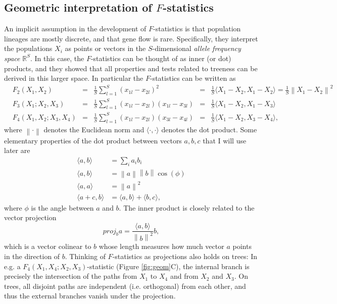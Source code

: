 \documentclass[12pt,fullpage, a4paper]{article}
\newcommand{\norm}[1]{\left\lVert#1\right\rVert}
\newcommand{\normsq}[1]{\left\lVert#1\right\rVert^2}
\newcommand{\vectorproj}[2][]{\textit{proj}_{#1}#2}
\begin{document}
\subsection{Geometric interpretation of $F$-statistics}
An implicit assumption in the development of $F$-statistics is that population lineages are mostly discrete, and that gene flow is rare. Specifically, they interpret the populations $X_i$ as points or vectors in the $S$-dimensional \emph{allele frequency space} $\mathbb{R}^S$. In this case, the $F$-statistics can be thought of as inner (or dot) products, and they showed that all properties and tests related to treeness can be derived in this larger space. In particular the $F$-statistics can be written as
\begin{subequations}
	\begin{align}
	&F_2(X_1, X_2) &=& \frac{1}{S}\sum_{l=1}^S(x_{1l} - x_{2l})^2
	&=& \frac{1}{S}\langle X_1 - X_2, X_1 - X_2 \rangle = \frac{1}{S}\normsq{X_1-  X_2}\\
	&F_3(X_1; X_2, X_3) &=& \frac{1}{S}\sum_{l=1}^S(x_{1l} - x_{2l})(x_{1l} - x_{3l}) &=& \frac{1}{S}\langle X_1 - X_2, X_1 - X_3 \rangle\\	
	&F_4(X_1, X_2; X_3, X_4) &=& \frac{1}{S}\sum_{l=1}^S(x_{1l} - x_{2l})(x_{3l} - x_{4l}) &=& \frac{1}{S}\langle X_1 - X_2, X_3 - X_4 \rangle	\text{,}
	\end{align}
\end{subequations}
where $\norm{\cdot}$ denotes the Euclidean norm and $\langle \cdot, \cdot \rangle$ denotes the dot product. Some elementary properties of the dot product between vectors $a, b, c$ that I will use later are
\begin{subequations}
	\begin{align}
	\langle a, b \rangle &= \sum_i a_ib_i\\
	\langle a, b \rangle &= \norm{a}\norm{b}\cos(\phi)\\
	\langle a, a \rangle &= \normsq{a}\\
	\langle a + c, b \rangle &= \langle a, b \rangle + \langle b, c \rangle,
	\end{align}
\end{subequations}
where $\phi$ is the angle between $a$ and $b$. The inner product is  closely related to the vector projection
\begin{equation}
\vectorproj[b]{a} = \frac{\langle a , b\rangle}{\normsq{b}} b,\label{eq:proj}
\end{equation}
which is a vector colinear to $b$ whose length measures how much vector $a$ points in the direction of $b$. Thinking of $F$-statistics as projections also holds on trees: In e.g. a $F_4(X_1, X_4; X_2, X_3)$-statistic (Figure \ref{fig:geom}C), the internal branch is precisely the intersection of the paths from $X_1$ to $X_4$ and from $X_2$ and $X_3$. On trees, all disjoint paths are independent (i.e. orthogonal) from each other, and thus the external branches vanish under the projection.
\end{document}
